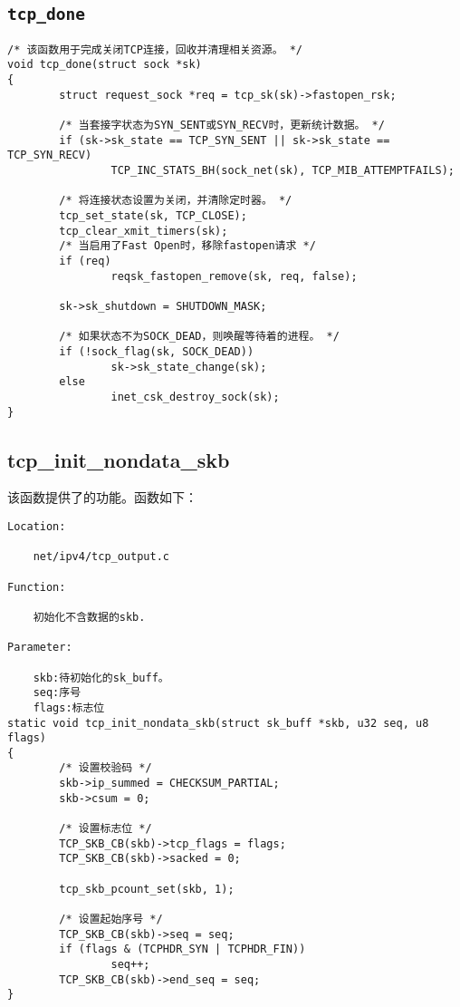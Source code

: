 \subsection{\texttt{tcp_done}}
\begin{verbatim}
/* 该函数用于完成关闭TCP连接，回收并清理相关资源。 */
void tcp_done(struct sock *sk)
{
        struct request_sock *req = tcp_sk(sk)->fastopen_rsk;

        /* 当套接字状态为SYN_SENT或SYN_RECV时，更新统计数据。 */
        if (sk->sk_state == TCP_SYN_SENT || sk->sk_state == TCP_SYN_RECV)
                TCP_INC_STATS_BH(sock_net(sk), TCP_MIB_ATTEMPTFAILS);

        /* 将连接状态设置为关闭，并清除定时器。 */
        tcp_set_state(sk, TCP_CLOSE);
        tcp_clear_xmit_timers(sk);
        /* 当启用了Fast Open时，移除fastopen请求 */
        if (req)
                reqsk_fastopen_remove(sk, req, false);

        sk->sk_shutdown = SHUTDOWN_MASK;

        /* 如果状态不为SOCK_DEAD，则唤醒等待着的进程。 */
        if (!sock_flag(sk, SOCK_DEAD))
                sk->sk_state_change(sk);
        else
                inet_csk_destroy_sock(sk);
}
\end{verbatim}

\subsection{tcp\_init\_nondata\_skb}
该函数提供了的功能。函数如下：


\begin{verbatim}
Location:

	net/ipv4/tcp_output.c
	
Function:

	初始化不含数据的skb.

Parameter:

	skb:待初始化的sk_buff。
  	seq:序号
	flags:标志位
static void tcp_init_nondata_skb(struct sk_buff *skb, u32 seq, u8 flags)
{
        /* 设置校验码 */
        skb->ip_summed = CHECKSUM_PARTIAL;
        skb->csum = 0;

        /* 设置标志位 */
        TCP_SKB_CB(skb)->tcp_flags = flags;
        TCP_SKB_CB(skb)->sacked = 0;

        tcp_skb_pcount_set(skb, 1);

        /* 设置起始序号 */
        TCP_SKB_CB(skb)->seq = seq;
        if (flags & (TCPHDR_SYN | TCPHDR_FIN))
                seq++;
        TCP_SKB_CB(skb)->end_seq = seq;
}
\end{verbatim}

